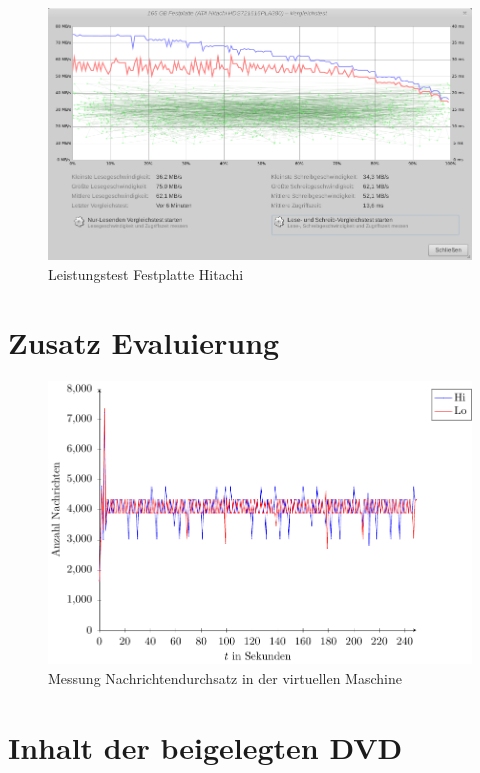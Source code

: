 \begin{figure}[htb!]
\centering
\includegraphics[width=1.0\textwidth]{bilder/LaufwerkstestHitachi165GB.png}
\caption{Leistungstest Festplatte Hitachi
\label{fig:festplatteLeistungstest}}
\end{figure}

\section{Zusatz Evaluierung}
\label{section:zusEvaluierung}

\begin{figure}[htb!]
\includegraphics[width=1.0\textwidth]{plots/virtualBoxRaw.pdf}
\caption{Messung Nachrichtendurchsatz in der virtuellen Maschine
\label{fig:messungMaxNachrichten}}
\end{figure}











\section{Inhalt der beigelegten DVD}
\label{section:inhaltDvd}

